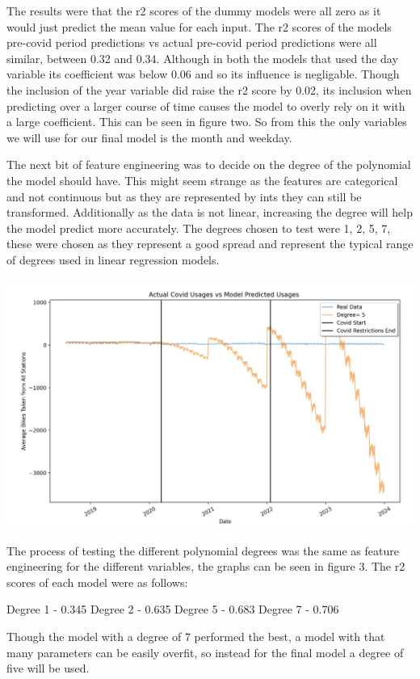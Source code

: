 \documentclass{article}
\begin{document}
The results were that the r2 scores of the dummy models were all zero as it would just predict the mean value for each input. The r2 scores of the models pre-covid period predictions vs actual pre-covid period predictions were all similar, between 0.32 and 0.34. Although in both the models that used the day variable its coefficient was below 0.06 and so its influence is negligable. Though the inclusion of the year variable did raise the r2 score by 0.02, its inclusion when predicting over a larger course of time causes the model to overly rely on it with a large coefficient. This can be seen in figure two. So from this the only variables we will use for our final model is the month and weekday.

The next bit of feature engineering was to decide on the degree of the polynomial the model should have. This might seem strange as the features are categorical and not continuous but as they are represented by ints they can still be transformed. Additionally as the data is not linear, increasing the degree will help the model predict more accurately. The degrees chosen to test were 1, 2, 5, 7,  these were chosen as they represent a good spread and represent the typical range of degrees used in linear regression models.

\begin{center}
\includegraphics[width=1\linewidth]{failure.png}
\end{center}

The process of testing the different polynomial degrees was the same as feature engineering for the different variables, the graphs can be seen in figure 3. The r2 scores of each model were as follows:
\begin{center}
Degree 1	-	0.345 \newline
Degree 2	-	0.635\newline
Degree 5	-	0.683\newline
Degree 7	-	0.706\newline
\end{center}
Though the model with a degree of 7 performed the best, a model with that many parameters can be easily overfit, so instead for the final model a degree of five will be used.
\end{document}

